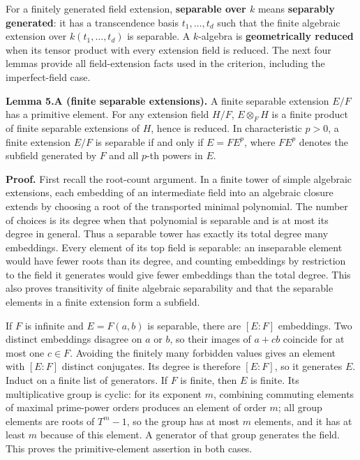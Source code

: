 \documentclass[
]{article}
\begin{document}
For a finitely generated field extension, \textbf{separable over \(k\)}
means \textbf{separably generated}: it has a transcendence basis
\(t_1,\ldots,t_d\) such that the finite algebraic extension over
\(k(t_1,\ldots,t_d)\) is separable. A \(k\)-algebra is
\textbf{geometrically reduced} when its tensor product with every
extension field is reduced. The next four lemmas provide all
field-extension facts used in the criterion, including the
imperfect-field case.

\textbf{Lemma 5.A (finite separable extensions).} A finite separable
extension \(E/F\) has a primitive element. For any extension field
\(H/F\), \(E\otimes_F H\) is a finite product of finite separable
extensions of \(H\), hence is reduced. In characteristic \(p>0\), a
finite extension \(E/F\) is separable if and only if \(E=FE^p\), where
\(FE^p\) denotes the subfield generated by \(F\) and all \(p\)-th powers
in \(E\).

\textbf{Proof.} First recall the root-count argument. In a finite tower
of simple algebraic extensions, each embedding of an intermediate field
into an algebraic closure extends by choosing a root of the transported
minimal polynomial. The number of choices is its degree when that
polynomial is separable and is at most its degree in general. Thus a
separable tower has exactly its total degree many embeddings. Every
element of its top field is separable: an inseparable element would have
fewer roots than its degree, and counting embeddings by restriction to
the field it generates would give fewer embeddings than the total
degree. This also proves transitivity of finite algebraic separability
and that the separable elements in a finite extension form a subfield.

If \(F\) is infinite and \(E=F(a,b)\) is separable, there are \([E:F]\)
embeddings. Two distinct embeddings disagree on \(a\) or \(b\), so their
images of \(a+cb\) coincide for at most one \(c\in F\). Avoiding the
finitely many forbidden values gives an element with \([E:F]\) distinct
conjugates. Its degree is therefore \([E:F]\), so it generates \(E\).
Induct on a finite list of generators. If \(F\) is finite, then \(E\) is
finite. Its multiplicative group is cyclic: for its exponent \(m\),
combining commuting elements of maximal prime-power orders produces an
element of order \(m\); all group elements are roots of \(T^m-1\), so
the group has at most \(m\) elements, and it has at least \(m\) because
of this element. A generator of that group generates the field. This
proves the primitive-element assertion in both cases.
\end{document}
